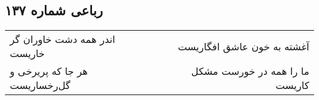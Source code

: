 \begin{center}
\section*{رباعی شماره ۱۳۷}
\label{sec:sh137}
\begin{longtable}{l p{0.5cm} r}
اندر همه دشت خاوران گر خاریست
&&
آغشته به خون عاشق افگاریست
\\
هر جا که پریرخی و گل‌رخساریست
&&
ما را همه در خورست مشکل کاریست
\\
\end{longtable}
\end{center}
